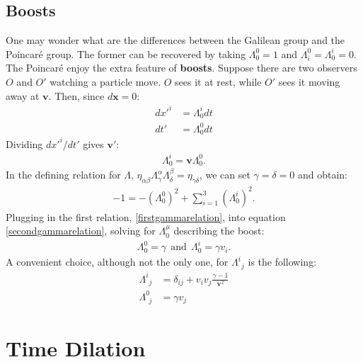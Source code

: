 \documentclass[11pt]{report}
\newcommand{\FR}[2]{\frac{#1}{#2}}
\theoremstyle{plain}
\theoremstyle{definition}
\theoremstyle{remark}
\newcommand{\gam}{\gamma}
\begin{document}
\subsection{Boosts}
One may wonder what are the differences between the Galilean group and the
Poincar\'e group. The former can be recovered by taking $\Lambda^0_0 = 1$
and $\Lambda^0_i = \Lambda^i_0 = 0$. The Poincar\'e enjoy the extra feature
of \textbf{boosts}. Suppose there are two observers $O$ and $O'$ watching a
particle move. $O$ sees it at rest, while $O'$ sees it moving away at $\bm
v$. Then, since $d\bm x = 0$:
\begin{align*}
    dx'^i &= \Lambda^i_0 dt\\
    dt'   &= \Lambda^0_0 dt
\end{align*}
Dividing $dx'^i/dt'$ gives $\bm v'$:
\begin{align}
\Lambda^i_0 = \bm v\Lambda^0_0.
    \label{firstgammarelation}
\end{align}
In the defining relation for $\Lambda$,
$\eta_{\alpha\beta}\Lambda^\alpha_\gam\Lambda^\beta_\delta =
\eta_{\gam\delta}$, we can set $\gam=\delta=0$ and obtain:
\begin{align}
-1 = -(\Lambda^0_0)^2+\sum_{i=1}^3 (\Lambda^i_0)^2.
\label{secondgammarelation}
\end{align}
Plugging in the first relation, \eqref{firstgammarelation}, into equation
\eqref{secondgammarelation}, solving for $\Lambda^\mu_0$ describing the
boost:
\begin{align}
    \Lambda^0_0 = \gam\ \ \text{and}\ \ \Lambda^i_0 = \gam v_i.
    \label{boost}
\end{align}
A convenient choice, although not the only one, for $\Lambda^i_{\ \ j}$ is
the following:
\begin{align}
    \Lambda^i_{\ \ j}&=\delta_{ij}+v_iv_j\FR{\gam-1}{\bm v^2}\\
    \Lambda^0_{\ \ j}&= \gam v_j
    \label{definingLambda}
\end{align}

\section{Time Dilation}
\end{document}
